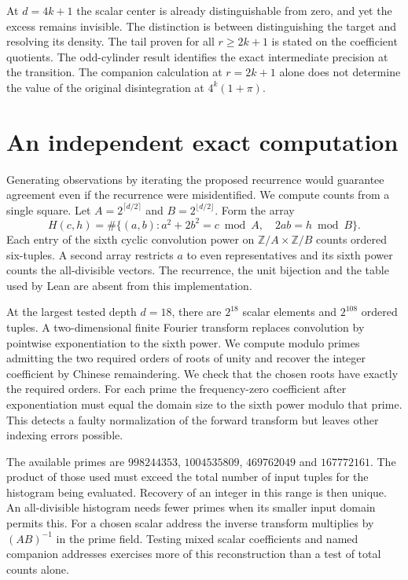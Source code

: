 \documentclass[12pt,letterpaper]{article}
\begin{document}
At $d=4k+1$ the scalar center is already distinguishable from zero, and yet the excess remains invisible. The distinction is between distinguishing the target and resolving its density. The tail proven for all $r\ge2k+1$ is stated on the coefficient quotients. The odd-cylinder result identifies the exact intermediate precision at the transition. The companion calculation at $r=2k+1$ alone does not determine the value of the original disintegration at $4^k(1+\pi)$.

\section{An independent exact computation}
Generating observations by iterating the proposed recurrence would guarantee agreement even if the recurrence were misidentified. We compute counts from a single square. Let $A=2^{\lceil d/2\rceil}$ and $B=2^{\lfloor d/2\rfloor}$. Form the array
\[
 H(c,h)=\#\{(a,b):a^2+2b^2=c\bmod A,\quad 2ab=h\bmod B\}.
\]
Each entry of the sixth cyclic convolution power on $\mathbb Z/A\times\mathbb Z/B$ counts ordered six-tuples. A second array restricts $a$ to even representatives and its sixth power counts the all-divisible vectors. The recurrence, the unit bijection and the table used by Lean are absent from this implementation.

At the largest tested depth $d=18$, there are $2^{18}$ scalar elements and $2^{108}$ ordered tuples. A two-dimensional finite Fourier transform replaces convolution by pointwise exponentiation to the sixth power. We compute modulo primes admitting the two required orders of roots of unity and recover the integer coefficient by Chinese remaindering. We check that the chosen roots have exactly the required orders. For each prime the frequency-zero coefficient after exponentiation must equal the domain size to the sixth power modulo that prime. This detects a faulty normalization of the forward transform but leaves other indexing errors possible.

The available primes are $998244353$, $1004535809$, $469762049$ and $167772161$. The product of those used must exceed the total number of input tuples for the histogram being evaluated. Recovery of an integer in this range is then unique. An all-divisible histogram needs fewer primes when its smaller input domain permits this. For a chosen scalar address the inverse transform multiplies by $(AB)^{-1}$ in the prime field. Testing mixed scalar coefficients and named companion addresses exercises more of this reconstruction than a test of total counts alone.
\end{document}
